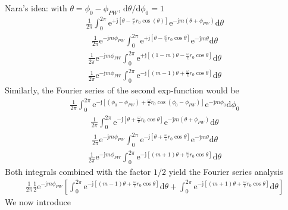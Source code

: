 \documentclass[a4paper,BCOR=15mm,10pt,twoside]{scrartcl}
\newcommand\e{\mathrm{e}}  %
\newcommand\im{\mathrm{j}}  %
\newcommand\fsd{\mathrm{d}}  %
\begin{document}
Nara's idea: with $\theta=\phi_0-\phi_{PW}$, $\fsd \theta / \fsd \phi_0 = 1$
\begin{align}
\frac{1}{2\pi}\int_0^{2\pi}
\mathrm{e}^{+\mathrm{j}[\theta-\frac{\omega}{c} r_0
\cos(\theta)]}
\e^{- \im m (\theta+\phi_{PW})} \fsd \theta
\end{align}
\begin{align}
\frac{1}{2\pi} \e^{- \im m \phi_{PW}} 
\int_0^{2\pi}
\mathrm{e}^{+\mathrm{j}[\theta-\frac{\omega}{c} r_0
\cos\theta]}
\e^{- \im m \theta} \fsd \theta
\end{align}
\begin{align}
\frac{1}{2\pi}
\e^{- \im m \phi_{PW}} 
\int_0^{2\pi}
\mathrm{e}^{+\mathrm{j}[(1-m)\theta-\frac{\omega}{c} r_0
\cos\theta]}
\fsd \theta
\end{align}
\begin{align}
\frac{1}{2\pi}
\e^{- \im m \phi_{PW}} 
\int_0^{2\pi}
\mathrm{e}^{-\mathrm{j}[(m-1)\theta+\frac{\omega}{c} r_0
\cos\theta]}
\fsd \theta
\end{align}
Similarly, the Fourier series of the second exp-function would be
\begin{align}
\frac{1}{2\pi}
\int_0^{2\pi}
\mathrm{e}^{-\mathrm{j}[(\phi_0-\phi_{PW})+\frac{\omega}{c} r_0
\cos(\phi_0-\phi_{PW})]}
\e^{- \im m \phi_0 } \fsd \phi_0
\end{align}
\begin{align}
\frac{1}{2\pi}
\int_0^{2\pi}
\mathrm{e}^{-\mathrm{j}[\theta+\frac{\omega}{c} r_0
\cos\theta]}
\e^{- \im m (\theta+\phi_{PW})} \fsd \theta
\end{align}
\begin{align}
\frac{1}{2\pi}
\e^{- \im m \phi_{PW}}
\int_0^{2\pi}
\mathrm{e}^{-\mathrm{j}[\theta+\frac{\omega}{c} r_0
\cos\theta]}
\e^{- \im m \theta} \fsd \theta
\end{align}
\begin{align}
\frac{1}{2\pi}
\e^{- \im m \phi_{PW}}
\int_0^{2\pi}
\mathrm{e}^{-\mathrm{j}[(m+1)\theta+\frac{\omega}{c} r_0
\cos\theta]}
\fsd \theta
\end{align}
Both integrals combined with the factor $1/2$ yield the Fourier series analysis
\begin{align}
\frac{1}{2\pi}
\frac{1}{2}
\e^{- \im m \phi_{PW}}
[
\int_0^{2\pi} \mathrm{e}^{-\mathrm{j}[(m-1)\theta+\frac{\omega}{c} r_0 \cos\theta]} \fsd \theta+
\int_0^{2\pi} \mathrm{e}^{-\mathrm{j}[(m+1)\theta+\frac{\omega}{c} r_0 \cos\theta]} \fsd \theta
]
\end{align}
We now introduce 
\end{document}
